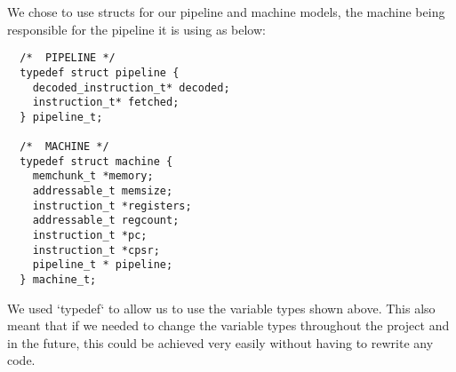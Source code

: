 We chose to use structs for our pipeline and machine models, the machine being responsible for the pipeline it is using as below:

\begin{verbatim}
  /*  PIPELINE */
  typedef struct pipeline {
    decoded_instruction_t* decoded;
    instruction_t* fetched;
  } pipeline_t;

  /*  MACHINE */
  typedef struct machine {
    memchunk_t *memory;
    addressable_t memsize;
    instruction_t *registers;
    addressable_t regcount;
    instruction_t *pc;
    instruction_t *cpsr;
    pipeline_t * pipeline;
  } machine_t;
\end{verbatim}

We used `typedef` to allow us to use the variable types shown above. This also meant that if we needed to change the variable types throughout the project and in the future, this could be achieved very easily without having to rewrite any code. 
